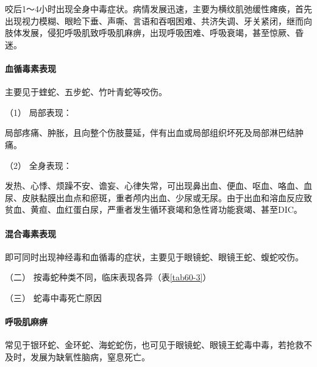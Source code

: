 咬后1～4小时出现全身中毒症状。病情发展迅速，主要为横纹肌弛缓性瘫痪，首先出现视力模糊、眼睑下垂、声嘶、言语和吞咽困难、共济失调、牙关紧闭，继而向肢体发展，侵犯呼吸肌致呼吸肌麻痹，出现呼吸困难、呼吸衰竭，甚至惊厥、昏迷。

\paragraph{血循毒素表现}

主要见于蝰蛇、五步蛇、竹叶青蛇等咬伤。

\hypertarget{text00172.htmlux5cux23CHP5-8-1-2-1-1-2-1}{}
（1） 局部表现：

局部疼痛、肿胀，且向整个伤肢蔓延，伴有出血或局部组织坏死及局部淋巴结肿痛。

\hypertarget{text00172.htmlux5cux23CHP5-8-1-2-1-1-2-2}{}
（2） 全身表现：

发热、心悸、烦躁不安、谵妄、心律失常，可出现鼻出血、便血、呕血、咯血、血尿、皮肤黏膜出血点和瘀斑，重者颅内出血、少尿或无尿。由于出血和溶血反应致贫血、黄疸、血红蛋白尿，严重者发生循环衰竭和急性肾功能衰竭、甚至DIC。

\paragraph{混合毒素表现}

即可同时出现神经毒和血循毒的症状，主要见于眼镜蛇、眼镜王蛇、蝮蛇咬伤。

\hypertarget{text00172.htmlux5cux23CHP5-8-1-2-1-2}{}
（二） 按毒蛇种类不同，临床表现各异（表\ref{tab60-3}）

\hypertarget{text00172.htmlux5cux23CHP5-8-1-2-1-3}{}
（三） 蛇毒中毒死亡原因

\paragraph{呼吸肌麻痹}

常见于银环蛇、金环蛇、海蛇蛇伤，也可见于眼镜蛇、眼镜王蛇毒中毒，若抢救不及时，发展为缺氧性脑病，窒息死亡。

